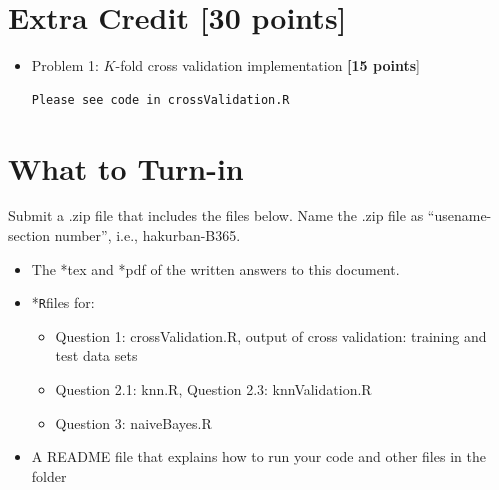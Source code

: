 \documentclass{article}
\newcommand{\quotes}[1]{``#1''}
\begin{document}
\pagebreak
  \section*{Extra Credit [30 points]} 
\begin{itemize}
\item Problem 1: $K$-fold cross validation implementation  \textbf{[15 points}]
\begin{verbatim}
Please see code in crossValidation.R
\end{verbatim}
\end{itemize}




\section*{What to Turn-in}
 Submit a .zip file that includes the files below. Name the .zip  file as \quotes{usename-section number}, i.e., hakurban-B365.


\begin{itemize}
\item The *tex and *pdf of the written answers to this document.
\item *\texttt{R}files for:
\begin{itemize}
\item Question 1: \textsf{crossValidation.R}, output of cross validation: training  and test data sets 
\item Question 2.1: \textsf{knn.R}, Question 2.3: \textsf{knnValidation.R}
\item Question 3: \textsf{naiveBayes.R}
\end{itemize} 
\item A README file that explains how to run your code and other files in the folder
\end{itemize}
\end{document}
